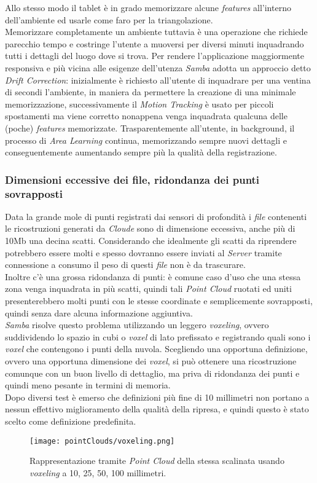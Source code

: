 Allo stesso modo il tablet è in grado memorizzare alcune \emph{features} all'interno dell'ambiente ed usarle come faro per la triangolazione. \\
Memorizzare completamente un ambiente tuttavia è una operazione che richiede parecchio tempo e costringe l'utente a muoversi per diversi minuti inquadrando tutti i dettagli del luogo dove si trova. Per rendere l'applicazione maggiormente responsiva e più vicina alle esigenze dell'utenza \emph{Samba} adotta un approccio detto \emph{Drift Correction}: inizialmente è richiesto all'utente di inquadrare per una ventina di secondi l'ambiente, in maniera da permettere la creazione di una minimale memorizzazione, successivamente il \emph{Motion Tracking} è usato per piccoli spostamenti ma viene corretto nonappena venga inquadrata qualcuna delle (poche) \emph{features} memorizzate. Trasparentemente all'utente, in background, il processo di \emph{Area Learning} continua, memorizzando sempre nuovi dettagli e conseguentemente aumentando sempre più la qualità della registrazione.\\

\subsubsection{Dimensioni eccessive dei file, ridondanza dei punti sovrapposti}
Data la grande mole di punti registrati dai sensori di profondità i \emph{file} contenenti le ricostruzioni generati da \emph{Cloude} sono di dimensione eccessiva, anche più di 10Mb una decina scatti.
Considerando che idealmente gli scatti da riprendere potrebbero essere molti e spesso dovranno essere inviati al \emph{Server} tramite connessione a consumo il peso di questi \emph{file} non è da trascurare.\\
Inoltre c'è una grossa ridondanza di punti: è comune caso d'uso che una stessa zona venga inquadrata in più scatti, quindi tali \emph{Point Cloud} ruotati ed uniti presenterebbero molti punti con le stesse coordinate e semplicemente sovrapposti, quindi senza dare alcuna informazione aggiuntiva.\\
\emph{Samba} risolve questo problema utilizzando un leggero \emph{voxeling}, ovvero suddividendo lo spazio in cubi o \emph{voxel} di lato prefissato e registrando quali sono i \emph{voxel} che contengono i punti della nuvola.
Scegliendo una opportuna definizione, ovvero una opportuna dimensione dei \emph{voxel}, si può ottenere una ricostruzione comunque con un buon livello di dettaglio, ma priva di ridondanza dei punti e quindi meno pesante in termini di memoria.\\
Dopo diversi test è emerso che definizioni più fine di 10 millimetri non portano a nessun effettivo miglioramento della qualità della ripresa, e quindi questo è stato scelto come definizione predefinita.
\begin{figure}[!h] 
    \centering 
    \texttt{[image: pointClouds/voxeling.png]} 
    \caption{Rappresentazione tramite \emph{Point Cloud} della stessa scalinata usando \emph{voxeling} a 10, 25, 50, 100 millimetri.}
\end{figure}

